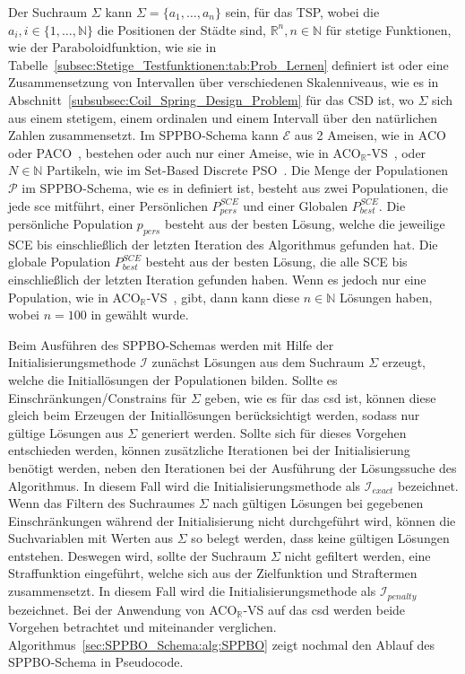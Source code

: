 \documentclass[fontsize=12, a4aper]{scrartcl}
\begin{document}
	\noindent Der Suchraum \(\Sigma\) kann \(\Sigma=\{a_1, \dots, a_n\}\) sein, für das TSP, wobei die \(a_i, i \in \{1, \dots, \mathbb{N}\}\) die Positionen der Städte sind, \(\mathbb{R}^n, n \in \mathbb{N}\) für stetige Funktionen, wie der Paraboloidfunktion, wie sie in Tabelle~\ref{subsec:Stetige_Testfunktionen:tab:Prob_Lernen} definiert ist oder eine Zusammensetzung von Intervallen über verschiedenen Skalenniveaus, wie es in Abschnitt~\ref{subsubsec:Coil_Spring_Design_Problem} für das CSD ist, wo \(\Sigma\) sich aus einem stetigem, einem ordinalen und einem Intervall über den natürlichen Zahlen zusammensetzt. Im SPPBO-Schema kann \(\mathcal{E}\) aus 2 Ameisen, wie in ACO~\cite{blum2005ant} oder PACO~\cite{guntsch2002population}, bestehen oder auch nur einer Ameise, wie in ACO\(_\mathbb{R}\)-VS~\cite{FCM_2019}, oder \(N \in \mathbb{N}\) Partikeln, wie im Set-Based Discrete PSO~\cite{chen2012set}. Die Menge der Populationen \(\mathcal{P}\) im SPPBO-Schema, wie es in \cite{lin2015simple} definiert ist, besteht aus zwei Populationen, die jede \ac{sce} mitführt, einer Persönlichen \(P^{SCE}_{pers}\) und einer Globalen \(P^{SCE}_{best}\). Die persönliche Population \(p_{pers}\) besteht aus der besten Lösung, welche die jeweilige SCE bis einschließlich der letzten Iteration des Algorithmus gefunden hat. Die globale Population \(P^{SCE}_{best}\) besteht aus der besten Lösung, die alle SCE bis einschließlich der letzten Iteration gefunden haben. Wenn es jedoch nur eine Population, wie in ACO\(_\mathbb{R}\)-VS~\cite{FCM_2019}, gibt, dann kann diese \(n \in \mathbb{N}\) Lösungen haben, wobei \(n = 100\) in \cite{FCM_2019} gewählt wurde.\hfill\newline
	
	\noindent Beim Ausführen des SPPBO-Schemas werden mit Hilfe der Initialisierungsmethode \(\mathcal{I}\) zunächst Lösungen aus dem Suchraum \(\Sigma\) erzeugt, welche die Initiallösungen der Populationen bilden. Sollte es Einschränkungen/Constrains für \(\Sigma\) geben, wie es für das \ac{csd} ist, können diese gleich beim Erzeugen der Initiallösungen berücksichtigt werden, sodass nur gültige Lösungen aus \(\Sigma\) generiert werden. Sollte sich für dieses Vorgehen entschieden werden, können zusätzliche Iterationen bei der Initialisierung benötigt werden, neben den Iterationen bei der Ausführung der Lösungssuche des Algorithmus. In diesem Fall wird die Initialisierungsmethode als \(\mathcal{I}_{exact}\) bezeichnet. Wenn das Filtern des Suchraumes \(\Sigma\) nach gültigen Lösungen bei gegebenen Einschränkungen während der Initialisierung nicht durchgeführt wird, können die Suchvariablen mit Werten aus \(\Sigma\) so belegt werden, dass keine gültigen Lösungen entstehen. Deswegen wird, sollte der Suchraum \(\Sigma\) nicht gefiltert werden, eine Straffunktion eingeführt, welche sich aus der Zielfunktion und Straftermen zusammensetzt. In diesem Fall wird die Initialisierungsmethode als \(\mathcal{I}_{penalty}\) bezeichnet. Bei der Anwendung von ACO\(_\mathbb{R}\)-VS auf das \ac{csd} werden beide Vorgehen betrachtet und miteinander verglichen. Algorithmus~\ref{sec:SPPBO_Schema:alg:SPPBO} zeigt nochmal den Ablauf des SPPBO-Schema in Pseudocode.\hfill\newline
\end{document}

